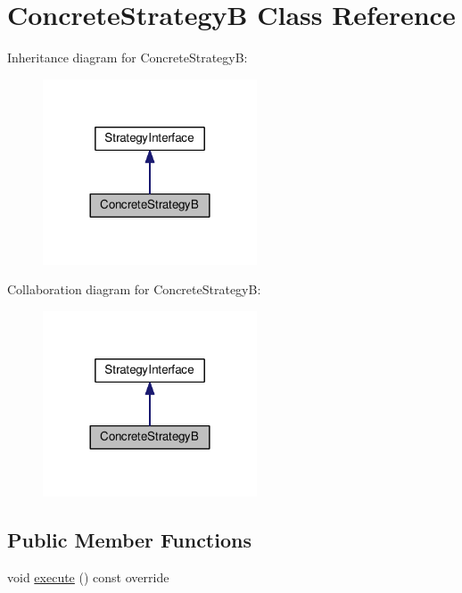 \hypertarget{classConcreteStrategyB}{}\section{Concrete\+StrategyB Class Reference}
\label{classConcreteStrategyB}


Inheritance diagram for Concrete\+StrategyB\+:
\nopagebreak
\begin{figure}[H]
\begin{center}
\leavevmode
\includegraphics[width=180pt]{classConcreteStrategyB__inherit__graph}
\end{center}
\end{figure}


Collaboration diagram for Concrete\+StrategyB\+:
\nopagebreak
\begin{figure}[H]
\begin{center}
\leavevmode
\includegraphics[width=180pt]{classConcreteStrategyB__coll__graph}
\end{center}
\end{figure}
\subsection*{Public Member Functions}
\begin{DoxyCompactItemize}
\item 
void \hyperlink{classConcreteStrategyB_ad17480f1a2bee9d7287954ffb5e040a2}{execute} () const override
\end{DoxyCompactItemize}


